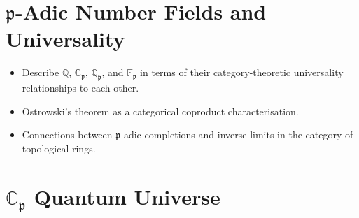 \documentclass[12pt,a4paper]{report}
\newcommand{\pp}{\mathfrak{p}}
\begin{document}
\section{\texorpdfstring{$\pp$}{p}-Adic Number Fields and Universality}
\label{sec:p-adic-fields}

\begin{itemize}
  \item Describe $\mathbb{Q}$, $\mathbb{C}_\pp$, $\mathbb{Q}_\pp$, and
        $\mathbb{F}_\pp$ in terms of their category-theoretic universality
        relationships to each other.
  \item Ostrowski's theorem as a categorical coproduct characterisation.
  \item Connections between $\pp$-adic completions and inverse limits in
        the category of topological rings.
\end{itemize}



\section{\texorpdfstring{$\mathbb{C}_\pp$}{C\_p} Quantum Universe}
\label{sec:cp-que}
\end{document}
